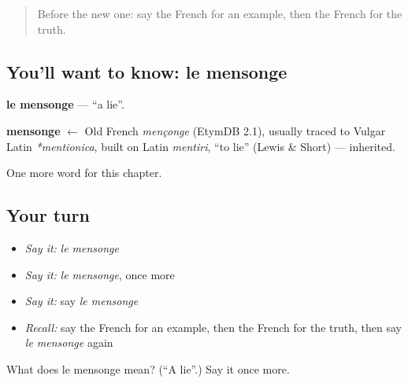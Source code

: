 \begin{quote}
Before the new one: say the French for an example, then the French for the truth.
\end{quote}

\subsection*{You'll want to know: le mensonge}
\textbf{le mensonge} — \textquotedblleft{}a lie\textquotedblright{}.

\begin{cousinweb}
\textbf{mensonge} $\leftarrow$ Old French \emph{mençonge} (EtymDB 2.1), usually traced to Vulgar Latin \emph{*mentionica}, built on Latin \emph{mentiri}, \textquotedblleft{}to lie\textquotedblright{} (Lewis \& Short) — inherited.
\end{cousinweb}

\begin{grammarlens}[title={What you've built}]
One more word for this chapter.
\end{grammarlens}

\subsection*{Your turn}
\begin{itemize}
\raggedright
  \item \emph{Say it:} \emph{le mensonge}
  \item \emph{Say it:} \emph{le mensonge}, once more
  \item \emph{Say it:} say \emph{le mensonge}
  \item \emph{Recall:} say the French for an example, then the French for the truth, then say \emph{le mensonge} again
\end{itemize}

\begin{tcolorbox}[breakable,colback=teal!4,colframe=teal!35!black,title={Before you move on}]
What does le mensonge mean? (\textquotedblleft{}A lie\textquotedblright{}.) Say it once more.
\end{tcolorbox}
